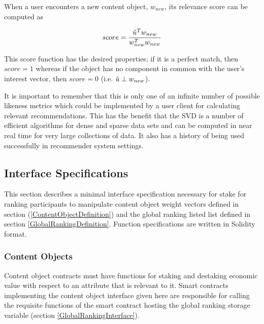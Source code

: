 When a user encounters a new content object, $w_{new}$, its relevance score can be computed as

\begin{equation}
    score = \frac{\Tilde{u}^Tw_{new}}{w_{new}^Tw_{new}}
\end{equation}

This score function has the desired properties; if it is a perfect match, then $score=1$ whereas if the object has no component in common with the user's interest vector, then $score = 0$ (i.e. $\Tilde{u} \perp w_{new}$).

It is important to remember that this is only one of an infinite number of possible likeness metrics which could be implemented by a user client for calculating relevant recommendations. This has the benefit that the SVD is a number of efficient algorithms for dense and sparse data sets and can be computed in near real time for very large collections of data. It also has a history of being used successfully in recommender system settings. 

\subsection{Interface Specifications}
\label{InterfaceDefinition}
This section describes a minimal interface specification necessary for stake for ranking participants to manipulate content object weight vectors defined in section (\ref{ContentObjectDefinition}) and the global ranking listed list defined in section \ref{GlobalRankingDefinition}. Function specifications are written in Solidity format.


\subsubsection{Content Objects}

Content object contracts must have functions for staking and destaking economic value with respect to an attribute that is relevant to it. Smart contracts implementing the content object interface given here are responsible for calling the requisite functions of the smart contract hosting the global ranking storage variable (section \ref{GlobalRankingInterface}). 

